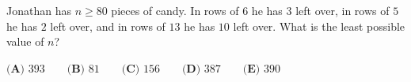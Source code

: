 Jonathan has $n\ge80$ pieces of candy. In rows of $6$ he has $3$ left over, in rows of $5$ he has $2$ left over, and in rows of $13$ he has $10$ left over. What is the least possible value of $n$?

$\textbf{(A) }393\qquad\textbf{(B) }81\qquad\textbf{(C) }156\qquad\textbf{(D) }387\qquad\textbf{(E) }390$
